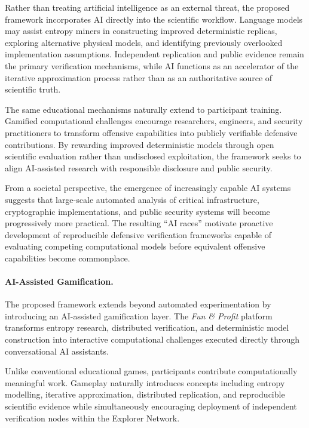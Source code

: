 \documentclass[11pt]{article}
\begin{document}
Rather than treating artificial intelligence as an external threat,
the proposed framework incorporates AI directly into the scientific
workflow.
Language models may assist entropy miners in constructing improved
deterministic replicas, exploring alternative physical models, and
identifying previously overlooked implementation assumptions.
Independent replication and public evidence remain the primary
verification mechanisms, while AI functions as an accelerator of the
iterative approximation process rather than as an authoritative source
of scientific truth.

The same educational mechanisms naturally extend to participant
training.
Gamified computational challenges encourage researchers, engineers,
and security practitioners to transform offensive capabilities into
publicly verifiable defensive contributions.
By rewarding improved deterministic models through open scientific
evaluation rather than undisclosed exploitation, the framework seeks
to align AI-assisted research with responsible disclosure and public
security.

From a societal perspective, the emergence of increasingly capable AI
systems suggests that large-scale automated analysis of critical
infrastructure, cryptographic implementations, and public security
systems will become progressively more practical.
The resulting ``AI races'' motivate proactive development of
reproducible defensive verification frameworks capable of evaluating
competing computational models before equivalent offensive
capabilities become commonplace.


\paragraph{AI-Assisted Gamification.}

The proposed framework extends beyond automated experimentation by
introducing an AI-assisted gamification layer.
The \emph{Fun \& Profit} platform transforms entropy research,
distributed verification,
and deterministic model construction into interactive computational
challenges executed directly through conversational AI assistants.

Unlike conventional educational games,
participants contribute computationally meaningful work.
Gameplay naturally introduces concepts including entropy modelling,
iterative approximation,
distributed replication,
and reproducible scientific evidence while simultaneously encouraging
deployment of independent verification nodes within the Explorer
Network.
\end{document}
